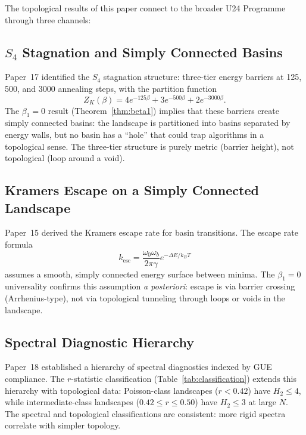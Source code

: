 \documentclass[12pt,a4paper]{article}
\theoremstyle{definition}\newtheorem{definition}[theorem]{Definition}
\theoremstyle{remark}\newtheorem{remark}[theorem]{Remark}
\newcommand{\Htwo}{H_2}
\newcommand{\betaone}{\beta_1}
\begin{document}
The topological results of this paper connect to the broader U24 Programme
through three channels:

\subsection{$S_4$ Stagnation and Simply Connected Basins}

Paper~17 \cite{paper17} identified the $S_4$ stagnation structure: three-tier
energy barriers at 125, 500, and 3000 annealing steps, with the partition
function
\begin{equation}
  Z_K(\beta) = 4 e^{-125\beta} + 3 e^{-500\beta} + 2 e^{-3000\beta}.
\end{equation}
The $\betaone = 0$ result (Theorem~\ref{thm:beta1}) implies that these
barriers create simply connected basins: the landscape is partitioned into
basins separated by energy walls, but no basin has a ``hole'' that could
trap algorithms in a topological sense. The three-tier structure is purely
metric (barrier height), not topological (loop around a void).

\subsection{Kramers Escape on a Simply Connected Landscape}

Paper~15 \cite{paper15} derived the Kramers escape rate for basin
transitions. The escape rate formula
\begin{equation}
  k_{\mathrm{esc}} = \frac{\omega_0 \omega_b}{2\pi \gamma} e^{-\Delta E / k_B T}
\end{equation}
assumes a smooth, simply connected energy surface between minima. The
$\betaone = 0$ universality confirms this assumption \emph{a posteriori}:
escape is via barrier crossing (Arrhenius-type), not via topological
tunneling through loops or voids in the landscape.

\subsection{Spectral Diagnostic Hierarchy}

Paper~18 \cite{paper18} established a hierarchy of spectral diagnostics
indexed by GUE compliance. The $r$-statistic classification
(Table~\ref{tab:classification}) extends this hierarchy with topological
data: Poisson-class landscapes ($r < 0.42$) have $\Htwo \leq 4$, while
intermediate-class landscapes ($0.42 \leq r \leq 0.50$) have $\Htwo \leq 3$
at large $N$. The spectral and topological classifications are consistent:
more rigid spectra correlate with simpler topology.
\end{document}
